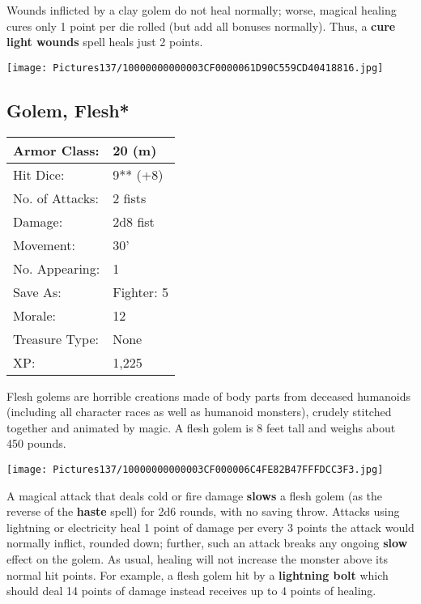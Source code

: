 \documentclass[a4paper,twoside,openany,10pt]{book}
\begin{document}
\begin{multicols}{2}
Wounds inflicted by a clay golem do not heal normally; worse, magical healing cures only 1 point per die rolled (but add all bonuses normally). Thus, a \textbf{cure light wounds }spell heals just 2 points.


\begin{center}
	\texttt{[image: Pictures137/10000000000003CF0000061D90C559CD40418816.jpg]}
\end{center}

\subsection*{Golem, Flesh*}\label{golem-flesh}

\begin{tabularx}{0.48\textwidth}{@{}lX@{}}
Armor Class: & 20 (m) \\\hline
Hit Dice: & 9** (+8) \\\hline
No. of Attacks: & 2 fists \\\hline
Damage: & 2d8 fist \\\hline
Movement: & 30' \\\hline
No. Appearing: & 1 \\\hline
Save As: & Fighter: 5 \\\hline
Morale: & 12 \\\hline
Treasure Type: & None \\\hline
XP: & 1,225 \\\hline
\end{tabularx}\medskip

Flesh golems are horrible creations made of body parts from deceased humanoids (including all character races as well as humanoid monsters), crudely stitched together and animated by magic. A flesh golem is 8 feet tall and weighs about 450 pounds.


\begin{center}
	\texttt{[image: Pictures137/10000000000003CF000006C4FE82B47FFFDCC3F3.jpg]}
\end{center}

A magical attack that deals cold or fire damage
\textbf{slows} a flesh golem (as the reverse of the \textbf{haste} spell) for 2d6 rounds, with no saving throw. Attacks using lightning or electricity heal 1 point of damage per every 3 points the attack would normally inflict, rounded down; further, such an attack breaks any ongoing \textbf{slow} effect on the golem. As usual, healing will not increase the monster above its normal hit points. For example, a flesh golem hit by a \textbf{lightning bolt} which should deal 14 points of damage instead receives up to 4 points of healing.


\end{multicols}
\end{document}
